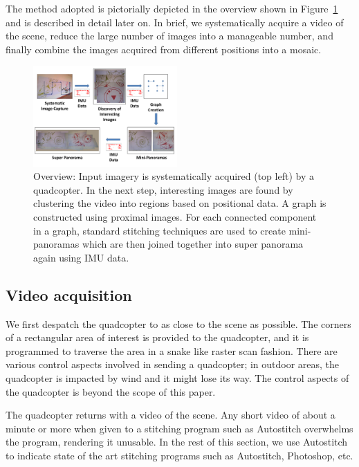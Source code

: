 \documentclass[10pt,twocolumn,letterpaper]{article}
\begin{document}
The method adopted is pictorially depicted in the overview shown in
Figure~\ref{fig:workflow} and is described in detail later on.  In
brief, we systematically acquire a video of the scene, reduce the large
number of images into a manageable number, and finally combine the
images acquired from different positions into a mosaic.

\begin{figure}[h!]
  \centering
  \includegraphics[width=0.49\textwidth]{figures/Workflow} 
  \caption{ \label{fig:workflow} Overview: Input imagery is
    systematically acquired (top left) by a quadcopter.  In the next
    step, interesting images are found by clustering the video into
    regions based on positional data.  A graph is constructed using
    proximal images. For each connected component in a graph, standard
    stitching techniques are used to create mini-panoramas which are
    then joined together into super panorama 
    again using IMU data.}
\end{figure}    


\subsection{Video acquisition}
We first despatch the quadcopter to as close to the scene as
possible. The corners of a rectangular area of interest is provided to
the quadcopter, and it is programmed to traverse the area in a snake
like raster scan fashion.  There are various control aspects involved
in sending a quadcopter; in outdoor areas, the quadcopter is impacted
by wind and it might lose its way.  The control aspects of the
quadcopter is beyond the scope of this paper.

The quadcopter returns with a video of the scene.  Any short video of
about a minute or more when given to a stitching program such as
Autostitch overwhelms the program, rendering it unusable. In the rest
of this section, we use Autostitch to indicate state of the art
stitching programs such as Autostitch, Photoshop, etc.
\end{document}
